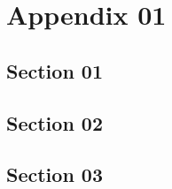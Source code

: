 \chapter{Appendix 01}
\section{Section 01}
\lipsum[1-3]
\section{Section 02}
\lipsum[1-3]
\section{Section 03}
\lipsum[1-3]